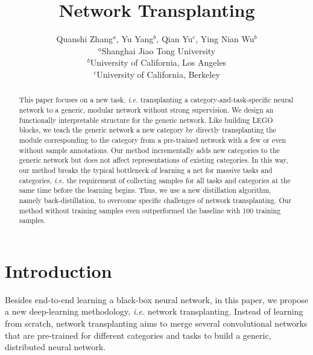 \documentclass[10pt,twocolumn,letterpaper]{article}
\begin{document}
\title{Network Transplanting}

\author{Quanshi Zhang$^{a}$, Yu Yang$^{b}$, Qian Yu$^{c}$, Ying Nian Wu$^{b}$\\
$^{a}$Shanghai Jiao Tong University\\
$^{b}$University of California, Los Angeles\\
$^{c}$University of California, Berkeley\\
}


\maketitle

\begin{abstract}
This paper focuses on a new task, \emph{i.e.} transplanting a category-and-task-specific neural network to a generic, modular network without strong supervision. We design an functionally interpretable structure for the generic network. Like building LEGO blocks, we teach the generic network a new category by directly transplanting the module corresponding to the category from a pre-trained network with a few or even without sample annotations. Our method incrementally adds new categories to the generic network but does not affect representations of existing categories. In this way, our method breaks the typical bottleneck of learning a net for massive tasks and categories, \emph{i.e.} the requirement of collecting samples for all tasks and categories at the same time before the learning begins. Thus, we use a new distillation algorithm, namely back-distillation, to overcome specific challenges of network transplanting. Our method without training samples even outperformed the baseline with 100 training samples.
\end{abstract}


\section{Introduction}

Besides end-to-end learning a black-box neural network, in this paper, we propose a new deep-learning methodology, \emph{i.e.} network transplanting.
Instead of learning from scratch, network transplanting aims to merge several convolutional networks that are pre-trained for different categories and tasks to build a generic, distributed neural network.
\end{document}
